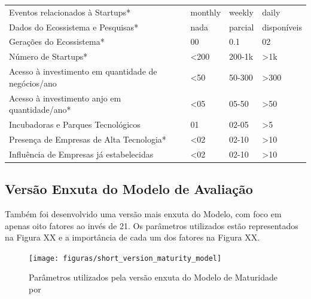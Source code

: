 \begin{table}[!htb]
\begin{tabular}{llll}
Eventos relacionados à Startups*                           &   monthly  &   weekly   &    daily    \\
Dados do Ecossistema e Pesquisas*                          &    nada    & parcial    & disponíveis \\
Gerações do Ecossistema*                                   &     00     &    0.1     &    02       \\
Número de Startups*                                        &    <200    &   200-1k   &    >1k      \\
Acesso à investimento em quantidade de negócios/ano        &    <50     &   50-300   &    >300     \\
Acesso à investimento anjo em quantidade/ano*              &    <05     &   05-50    &    >50      \\
Incubadoras e Parques Tecnológicos                         &     01     &    02-05   &    >5       \\
Presença de Empresas de Alta Tecnologia*                   &    <02     &   02-10    &    >10      \\
Influência de Empresas já estabelecidas                    &    <02     &   02-10    &    >10      \\
\end{tabular}
\end{table}

\subsection{Versão Enxuta do Modelo de Avaliação}
\label{subsection:versao_enxuta_do_modelo_de_avaliacao}

Também foi desenvolvido uma versão mais enxuta do Modelo, com foco em apenas oito fatores ao invés de 21. Os parâmetros utilizados estão representados na Figura XX e a importância de cada um dos fatores na Figura XX.

\begin{figure}[!htb]
\centering
\texttt{[image: figuras/short\_version\_maturity\_model]}
\caption{Parâmetros utilizados pela versão enxuta do Modelo de Maturidade por }
\label{figure:short_version_maturity_model}
\end{figure}

